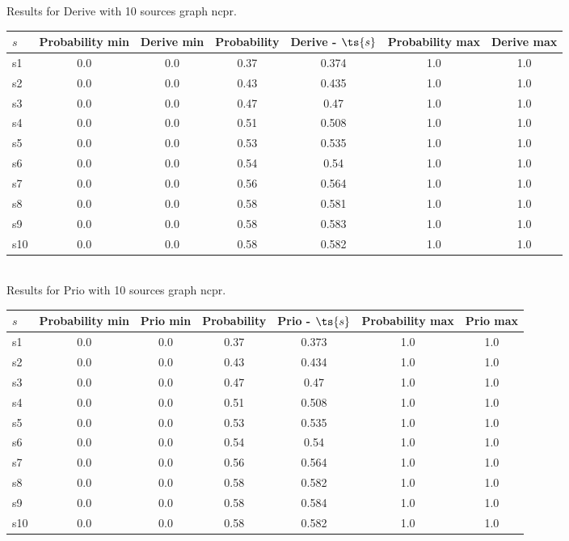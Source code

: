 \documentclass{article}
\begin{document}
\noindent Results for Derive with 10 sources graph ncpr.

\noindent\begin{tabular}{|l|c|c|c|c|c|c|}
\hline
$s$& Probability min & Derive min & Probability & Derive - $\ts{s}$ & Probability max & Derive max\\
\hline
s1 &0.0 & 0.0 & 0.37 & 0.374 & 1.0 & 1.0\\
\hline
s2 &0.0 & 0.0 & 0.43 & 0.435 & 1.0 & 1.0\\
\hline
s3 &0.0 & 0.0 & 0.47 & 0.47 & 1.0 & 1.0\\
\hline
s4 &0.0 & 0.0 & 0.51 & 0.508 & 1.0 & 1.0\\
\hline
s5 &0.0 & 0.0 & 0.53 & 0.535 & 1.0 & 1.0\\
\hline
s6 &0.0 & 0.0 & 0.54 & 0.54 & 1.0 & 1.0\\
\hline
s7 &0.0 & 0.0 & 0.56 & 0.564 & 1.0 & 1.0\\
\hline
s8 &0.0 & 0.0 & 0.58 & 0.581 & 1.0 & 1.0\\
\hline
s9 &0.0 & 0.0 & 0.58 & 0.583 & 1.0 & 1.0\\
\hline
s10 &0.0 & 0.0 & 0.58 & 0.582 & 1.0 & 1.0\\
\hline
\end{tabular}\\

\noindent Results for Prio with 10 sources graph ncpr.

\noindent\begin{tabular}{|l|c|c|c|c|c|c|}
\hline
$s$& Probability min & Prio min & Probability & Prio - $\ts{s}$ & Probability max & Prio max\\
\hline
s1 &0.0 & 0.0 & 0.37 & 0.373 & 1.0 & 1.0\\
\hline
s2 &0.0 & 0.0 & 0.43 & 0.434 & 1.0 & 1.0\\
\hline
s3 &0.0 & 0.0 & 0.47 & 0.47 & 1.0 & 1.0\\
\hline
s4 &0.0 & 0.0 & 0.51 & 0.508 & 1.0 & 1.0\\
\hline
s5 &0.0 & 0.0 & 0.53 & 0.535 & 1.0 & 1.0\\
\hline
s6 &0.0 & 0.0 & 0.54 & 0.54 & 1.0 & 1.0\\
\hline
s7 &0.0 & 0.0 & 0.56 & 0.564 & 1.0 & 1.0\\
\hline
s8 &0.0 & 0.0 & 0.58 & 0.582 & 1.0 & 1.0\\
\hline
s9 &0.0 & 0.0 & 0.58 & 0.584 & 1.0 & 1.0\\
\hline
s10 &0.0 & 0.0 & 0.58 & 0.582 & 1.0 & 1.0\\
\hline
\end{tabular}\\
\end{document}
